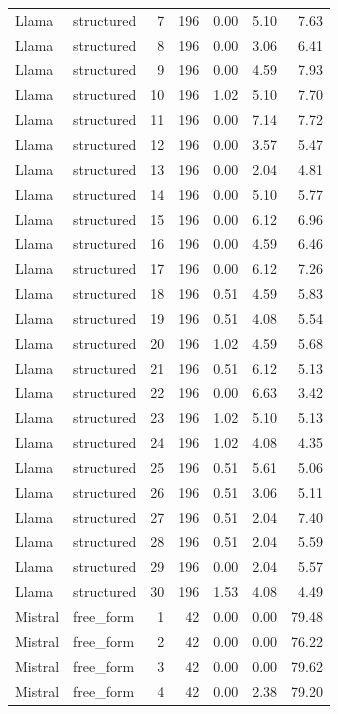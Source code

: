 \begin{longtable}{llrrrrr}
Llama & structured & 7 & 196 & 0.00 & 5.10 & 7.63 \\
Llama & structured & 8 & 196 & 0.00 & 3.06 & 6.41 \\
Llama & structured & 9 & 196 & 0.00 & 4.59 & 7.93 \\
Llama & structured & 10 & 196 & 1.02 & 5.10 & 7.70 \\
Llama & structured & 11 & 196 & 0.00 & 7.14 & 7.72 \\
Llama & structured & 12 & 196 & 0.00 & 3.57 & 5.47 \\
Llama & structured & 13 & 196 & 0.00 & 2.04 & 4.81 \\
Llama & structured & 14 & 196 & 0.00 & 5.10 & 5.77 \\
Llama & structured & 15 & 196 & 0.00 & 6.12 & 6.96 \\
Llama & structured & 16 & 196 & 0.00 & 4.59 & 6.46 \\
Llama & structured & 17 & 196 & 0.00 & 6.12 & 7.26 \\
Llama & structured & 18 & 196 & 0.51 & 4.59 & 5.83 \\
Llama & structured & 19 & 196 & 0.51 & 4.08 & 5.54 \\
Llama & structured & 20 & 196 & 1.02 & 4.59 & 5.68 \\
Llama & structured & 21 & 196 & 0.51 & 6.12 & 5.13 \\
Llama & structured & 22 & 196 & 0.00 & 6.63 & 3.42 \\
Llama & structured & 23 & 196 & 1.02 & 5.10 & 5.13 \\
Llama & structured & 24 & 196 & 1.02 & 4.08 & 4.35 \\
Llama & structured & 25 & 196 & 0.51 & 5.61 & 5.06 \\
Llama & structured & 26 & 196 & 0.51 & 3.06 & 5.11 \\
Llama & structured & 27 & 196 & 0.51 & 2.04 & 7.40 \\
Llama & structured & 28 & 196 & 0.51 & 2.04 & 5.59 \\
Llama & structured & 29 & 196 & 0.00 & 2.04 & 5.57 \\
Llama & structured & 30 & 196 & 1.53 & 4.08 & 4.49 \\
Mistral & free\_form & 1 & 42 & 0.00 & 0.00 & 79.48 \\
Mistral & free\_form & 2 & 42 & 0.00 & 0.00 & 76.22 \\
Mistral & free\_form & 3 & 42 & 0.00 & 0.00 & 79.62 \\
Mistral & free\_form & 4 & 42 & 0.00 & 2.38 & 79.20 \\

\end{longtable}
